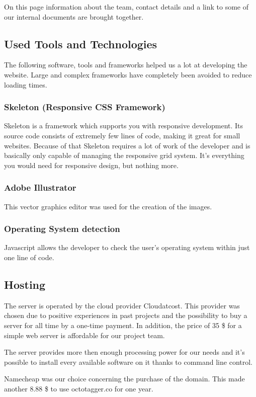 On this page information about the team, contact details and a link to some of our internal documents are brought together. 

\subsection{Used Tools and Technologies}

The following software, tools and frameworks helped us a lot at developing the website. Large and complex frameworks have completely been avoided to reduce loading times.


\subsubsection{Skeleton (Responsive CSS Framework)}
\label{sec:Skeleton}

Skeleton is a framework which supports you with responsive development. Its source code consists of extremely few lines of code, making it great for small websites. Because of that Skeleton requires a lot of work of the developer and is basically only capable of managing the responsive grid system. It's everything you would need for responsive design, but nothing more.

\subsubsection{Adobe Illustrator}

This vector graphics editor was used for the creation of the images. 

\subsubsection{Operating System detection}
\label{sec:OSdetection}

Javascript allows the developer to check the user's operating system within just one line of code.

\subsection{Hosting}

The server is operated by the cloud provider Cloudatcost. This provider was chosen due to positive experiences in past projects and the possibility to buy a server for all time by a one-time payment. In addition, the price of 35 \$ for a simple web server is affordable for our project team. 

The server provides more then enough processing power for our needs and it's possible to install every available software on it thanks to command line control.

Namecheap was our choice concerning the purchase of the domain. This made another 8.88 \$ to use octotagger.co for one year.
